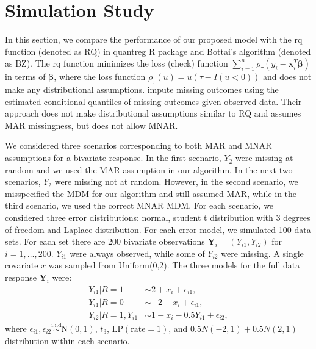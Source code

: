 \documentclass[useAMS,usenatbib,referee]{biom}
\newcommand{\iid}{\stackrel{\mbox{i.i.d}}{\sim}}
\begin{document}

\section{Simulation Study}
\label{ch3:sec:simulation}
In this section,
we compare the performance of our proposed model with the rq function (denoted as RQ) in quantreg R package \citep{quantreg} and Bottai's algorithm \citep{bottai2013} (denoted as BZ).
The rq function minimizes the loss (check) function $\sum_{i=1}^n \rho_{\tau} (y_i - \bm x_i^T \bm \beta)$ in terms of $\bm \beta$,
where the loss function $\rho_{\tau} (u) = u(\tau - I(u < 0))$ and does not make any distributional assumptions.
\citet{bottai2013} impute missing outcomes using the estimated conditional quantiles of missing outcomes given observed data.
Their approach does not make distributional assumptions similar to RQ and assumes MAR missingness, but does not allow MNAR.

We considered three scenarios corresponding to both MAR and MNAR assumptions for a bivariate response.
In the first scenario, $Y_2$ were missing at random and we used the MAR assumption in our algorithm.
In the next two scenarios, $Y_2$ were missing not at random.
However, in the second scenario, we misspecified the MDM for our algorithm and still assumed MAR, while in the third scenario, we used the correct MNAR MDM.
For each scenario, we considered three error distributions: normal, student t distribution with 3 degrees of freedom and Laplace distribution.
For each error model, we simulated 100 data sets.
For each set there are 200 bivariate observations $\bm Y_i = (Y_{i1}, Y_{i2})$ for $i = 1, \ldots, 200$.
$Y_{i1}$ were always observed, while some of $Y_{i2}$ were missing.
A single covariate $x$ was sampled from Uniform(0,2).
The three models for the full data response $\bm Y_i$ were:
\begin{align*}
  Y_{i1} | R = 1 & \sim 2 + x_i +  \epsilon_{i1} , \\
  Y_{i1}| R = 0 & \sim  -2 - x_i +  \epsilon_{i1} , \\
  Y_{i2}| R = 1, Y_{i1}&\sim 1 - x_i - 0.5Y_{i1} + \epsilon_{i2},
\end{align*}
where $\epsilon_{i1}, \epsilon_{i2} \iid \textrm{N}(0, 1)$, $t_3$,
$\mbox{LP}(\mbox{rate} = 1)$, and $0.5 N(-2, 1) + 0.5 N(2, 1)$ distribution within each scenario.
\end{document}
